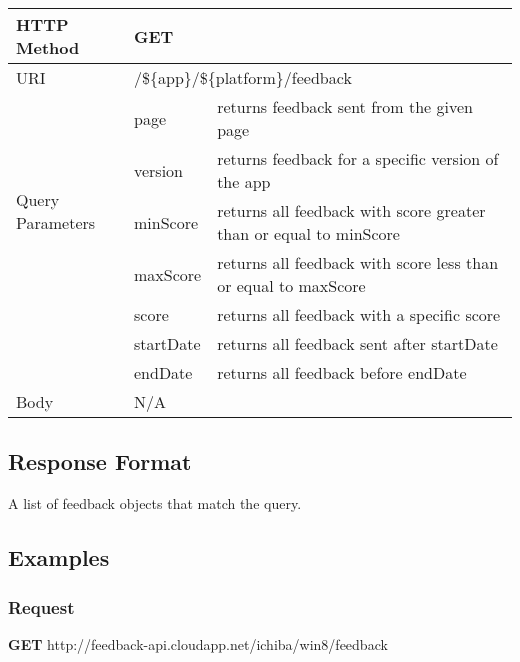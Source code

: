 \begin{center}
\begin{tabular}{|l||l|l|}
\hline
HTTP Method & \multicolumn{2}{l|}{GET}           \\
\hline
\hline
URI         & \multicolumn{2}{l|}{/\$\{app\}/\$\{platform\}/feedback} \\
\hline
\hline
\multirow{5}{*}{Query Parameters}

& page & returns feedback sent from the given page \\
\cline{2-3}
& version & returns feedback for a specific version of the app \\
\cline{2-3}
& minScore & returns all feedback with score greater than or equal to minScore \\
\cline{2-3}
& maxScore & returns all feedback with score less than or equal to maxScore \\
\cline{2-3}
& score & returns all feedback with a specific score \\
\cline{2-3}
& startDate & returns all feedback sent after startDate \\
\cline{2-3}
& endDate & returns all feedback before endDate \\

\hline
\hline
Body        & \multicolumn{2}{l|}{N/A}           \\
\hline
\end{tabular}
\end{center}

\subsection{Response Format}

A list of feedback objects that match the query.

\subsection{Examples}

\subsubsection{Request}

\textbf{GET} http://feedback-api.cloudapp.net/ichiba/win8/feedback

